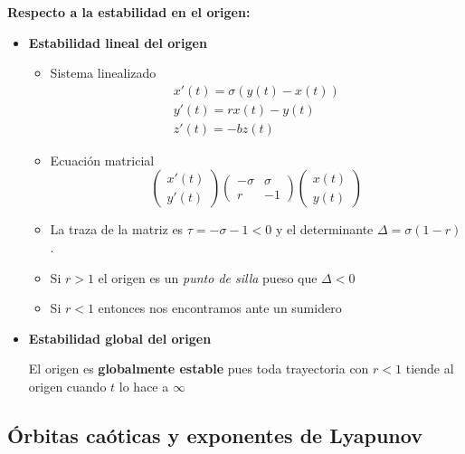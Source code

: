 \documentclass[8pt]{beamer}
\begin{document}
\begin{frame}
\textbf{Respecto a la estabilidad en el origen:}

\begin{itemize}[<+(1)->]
\item \textbf{Estabilidad lineal del origen}

\begin{itemize}[<+(1)->]
\item Sistema linealizado
\[\begin{array}{l}
x'(t) = σ(y(t)-x(t)) \\
y'(t) = rx(t)-y(t)\\
z'(t) = -bz(t)
\end{array}\]
\item Ecuación matricial
\[\left(\begin{array}{l}
x'(t) \\ y'(t)
\end{array} \right)\left(\begin{array}{cc}
-σ & σ \\ r & -1
\end{array} \right)\left(\begin{array}{l}
x(t) \\ y(t)
\end{array} \right)\]
\item La traza de la matriz es $τ=-σ-1<0$ y el determinante $Δ = σ(1-r)$.
\item Si $r>1$ el origen es un \emph{punto de silla} pueso que $Δ<0$
\item Si $r<1$ entonces nos encontramos ante un sumidero
\end{itemize}
\item \textbf{Estabilidad global del origen}

El origen es \textbf{globalmente estable} pues toda trayectoria con $r<1$ tiende al origen cuando $t$ lo hace a $\infty$
\end{itemize}
\end{frame}


\subsection{Órbitas caóticas y exponentes de Lyapunov}
\end{document}
